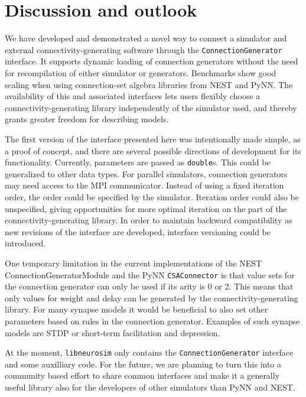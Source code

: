 \documentclass{frontiersSCNS} %
\begin{document}

\section{Discussion and outlook}

We have developed and demonstrated a novel way to connect a simulator
and external connectivity-generating software through the
\verb|ConnectionGenerator| interface. It supports dynamic loading of
connection generators without the need for recompilation of either
simulator or generators. Benchmarks show good scaling when using
connection-set algebra libraries from NEST and PyNN. The availability
of this and associated interfaces lets users flexibly choose a
connectivity-generating library independently of the simulator used,
and thereby grants greater freedom for describing models.

The first version of the interface presented here was intentionally
made simple, as a proof of concept, and there are several possible
directions of development for its functionality. Currently, parameters
are passed as \verb|double|s. This could be generalized to other data
types.  For parallel simulators, connection generators may need access
to the MPI communicator.  Instead of using a fixed iteration order,
the order could be specified by the simulator. Iteration order could
also be unspecified, giving opportunities for more optimal iteration
on the part of the connectivity-generating library.  In order to
maintain backward compatibility as new revisions of the interface are
developed, interface versioning could be introduced.

One temporary limitation in the current implementations of the NEST
ConnectionGeneratorModule and the PyNN \verb|CSAConnector| is that
value sets for the connection generator can only be used if its arity
is 0 or 2. This means that only values for weight and delay can be
generated by the connectivity-generating library. For many synapse
models it would be beneficial to also set other parameters based on
rules in the connection generator. Examples of such synapse models are
STDP or short-term facilitation and depression.

At the moment, \verb|libneurosim| only contains the
\verb|ConnectionGenerator| interface and some auxilliary code. For the
future, we are planning to turn this into a community based effort to
share common interfaces and make it a generally useful library also
for the developers of other simulators than PyNN and NEST.
\end{document}
